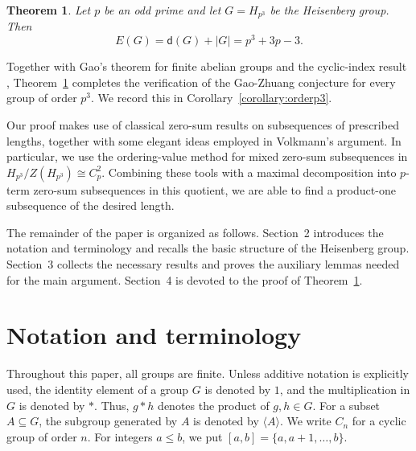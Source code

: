 \documentclass[a4paper, 12pt]{article}
\newtheorem{theorem}{Theorem}[section]
\theoremstyle{definition}
\begin{document}
\begin{theorem}\label{theorem:main}
Let $p$ be an odd prime and let $G=H_{p^3}$ be the Heisenberg group. Then
$$E(G)=\mathsf d(G)+|G|=p^3+3p-3.$$
\end{theorem}

Together with Gao's theorem for finite abelian groups and the
cyclic-index result \cite[Corollary~4.5]{QuWangLi},
Theorem~\ref{theorem:main} completes the verification of the
Gao-Zhuang conjecture for every group of order $p^3$. We record this
in Corollary~\ref{corollary:orderp3}.



Our proof makes use of classical zero-sum results on subsequences of prescribed lengths, together with some elegant ideas employed in Volkmann's argument. In particular, we use the ordering-value method for mixed zero-sum subsequences in $H_{p^3}/Z(H_{p^3})\cong C_p^2$. Combining these tools with a maximal decomposition into $p$-term zero-sum subsequences in this quotient, we are able to find a product-one subsequence of the desired length.

The remainder of the paper is organized as follows. Section~2 introduces the notation and terminology and recalls the basic structure of the Heisenberg group. Section~3 collects the necessary results and proves the auxiliary lemmas needed for the main argument. Section~4 is devoted to the proof of Theorem~\ref{theorem:main}.

\section{Notation and terminology}


Throughout this paper, all groups are finite. Unless additive notation
is explicitly used, the identity element of a group $G$ is denoted by
$1$, and the multiplication in $G$ is denoted by $\ast$. Thus,
$g\ast h$ denotes the product of $g,h\in G$. For a subset
$A\subseteq G$, the subgroup generated by $A$ is denoted by
$\langle A\rangle$. We write $C_n$ for a cyclic group of order $n$. For integers
$a\le b$, we put $[a, b]=\{a, a+1,\ldots, b\}$.
\end{document}
